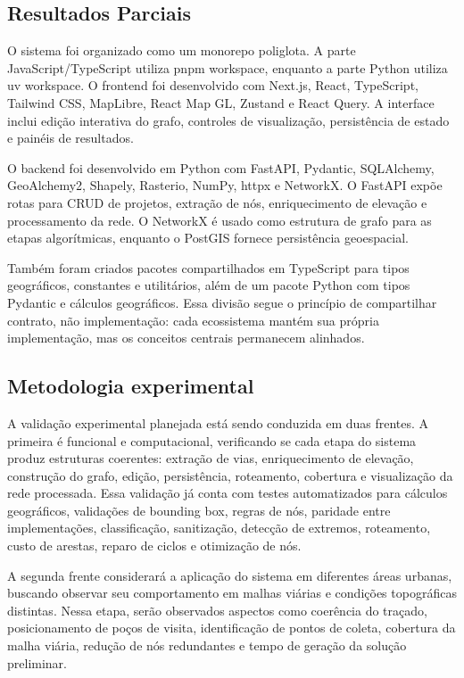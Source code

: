 \documentclass[12pt,a4paper]{article}
\begin{document}
\subsection{Resultados Parciais}

O sistema foi organizado como um monorepo poliglota.
A parte JavaScript/TypeScript utiliza pnpm workspace, enquanto a parte Python utiliza uv workspace. O frontend foi desenvolvido com Next.js, React, TypeScript, Tailwind CSS, MapLibre, React Map GL, Zustand e React Query. A interface inclui edição interativa do grafo, controles de visualização, persistência de estado e painéis de resultados.

O backend foi desenvolvido em Python com FastAPI, Pydantic, SQLAlchemy, GeoAlchemy2, Shapely, Rasterio, NumPy, httpx e NetworkX. O FastAPI expõe rotas para CRUD de projetos, extração de nós, enriquecimento de elevação e processamento da rede.
O NetworkX é usado como estrutura de grafo para as etapas algorítmicas, enquanto o PostGIS fornece persistência geoespacial.

Também foram criados pacotes compartilhados em TypeScript para tipos geográficos, constantes e utilitários, além de um pacote Python com tipos Pydantic e cálculos geográficos.
Essa divisão segue o princípio de compartilhar contrato, não implementação: cada ecossistema mantém sua própria implementação, mas os conceitos centrais permanecem alinhados.

\subsection{Metodologia experimental}

A validação experimental planejada está sendo conduzida em duas frentes.
A primeira é funcional e computacional, verificando se cada etapa do sistema produz estruturas coerentes: extração de vias, enriquecimento de elevação, construção do grafo, edição, persistência, roteamento, cobertura e visualização da rede processada.
Essa validação já conta com testes automatizados para cálculos geográficos, validações de bounding box, regras de nós, paridade entre implementações, classificação, sanitização, detecção de extremos, roteamento, custo de arestas, reparo de ciclos e otimização de nós.

A segunda frente considerará a aplicação do sistema em diferentes áreas urbanas, buscando observar seu comportamento em malhas viárias e condições topográficas distintas.
Nessa etapa, serão observados aspectos como coerência do traçado, posicionamento de poços de visita, identificação de pontos de coleta, cobertura da malha viária, redução de nós redundantes e tempo de geração da solução preliminar.
\end{document}
